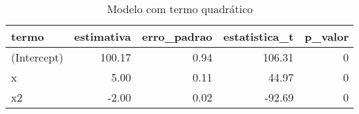 \begin{table}

\caption{\label{tab:tabela2_exemplo4}Modelo com termo quadrático}
\centering
\begin{tabular}[t]{l|r|r|r|r}
\hline
termo & estimativa & erro\_padrao & estatistica\_t & p\_valor\\
\hline
(Intercept) & 100.17 & 0.94 & 106.31 & 0\\
\hline
x & 5.00 & 0.11 & 44.97 & 0\\
\hline
x2 & -2.00 & 0.02 & -92.69 & 0\\
\hline
\end{tabular}
\end{table}
